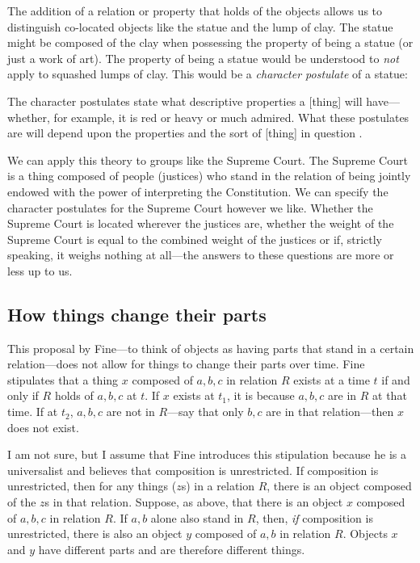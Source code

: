 \documentclass[11pt]{article}
\newenvironment{squote}{%
\begin{spacing}{1}
\begin{list}{}{%
\setlength{\labelwidth}{0pt}%
\rightmargin\leftmargin%
}
\item\relax
}{%
\end{list}%
\end{spacing}
}
\begin{document}
\begin{spacing}{1.5}
The addition of a relation or property that holds of the objects
allows us to distinguish co-located objects like the statue and the
lump of clay.  The statue might be composed of the clay when
possessing the property of being a statue (or just a work of art).
The property of being a statue would be understood to {\em not} apply
to squashed lumps of clay.  This would be a {\em character postulate}
of a statue:

\begin{squote}
The character postulates state what descriptive properties a [thing]
will have---whether, for example, it is red or heavy or much admired.
What these postulates are will depend upon the properties and the sort
of [thing] in question \citep[67]{fine1999}.
\end{squote}

We can apply this theory to groups like the Supreme Court.  The
Supreme Court is a thing composed of people (justices) who stand in
the relation of being jointly endowed with the power of interpreting
the Constitution.  We can specify the character postulates for the
Supreme Court however we like.  Whether the Supreme Court is located
wherever the justices are, whether the weight of the Supreme Court is
equal to the combined weight of the justices or if, strictly speaking,
it weighs nothing at all---the answers to these questions are more or
less up to us.

\subsection{How things change their parts}
\label{h-part}
This proposal by Fine---to think of objects as having parts that stand
in a certain relation---does not allow for things to change their
parts over time.  Fine stipulates that a thing $x$ composed of $a, b,
c$ in relation $R$ exists at a time $t$ if and only if $R$ holds of
$a, b, c$ at $t$.  If $x$ exists at $t_1$, it is because $a, b, c$ are
in $R$ at that time.  If at $t_2$, $a, b, c$ are not in $R$---say that
only $b, c$ are in that relation---then $x$ does not exist.

I am not sure, but I assume that Fine introduces this stipulation
because he is a universalist and believes that composition is
unrestricted.  If composition is unrestricted, then for any things
($z$s) in a relation $R$, there is an object composed of the $z$s in
that relation.  Suppose, as above, that there is an object $x$
composed of $a, b, c$ in relation $R$.  If $a, b$ alone also stand in
$R$, then, {\em if} composition is unrestricted, there is also an
object $y$ composed of $a, b$ in relation $R$.  Objects $x$ and $y$
have different parts and are therefore different things.


\end{spacing}
\end{document}
